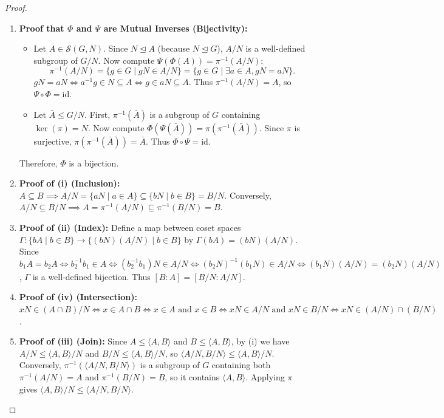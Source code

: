 \begin{proof}
\begin{enumerate}[label=\arabic*., leftmargin=*]
    \item \textbf{Proof that $\Phi$ and $\Psi$ are Mutual Inverses (Bijectivity):}
    \begin{itemize}[leftmargin=1.5em, itemsep=4pt]
        \item Let $A \in \mathcal{S}(G, N)$.
        Since $N \trianglelefteq A$ (because $N \trianglelefteq G$), $A/N$ is a well-defined subgroup of $G/N$.
        Now compute $\Psi(\Phi(A)) = \pi^{-1}(A/N)$:
        \begin{equation*}
        \pi^{-1}(A/N) = \{ g \in G \mid gN \in A/N \} = \{ g \in G \mid \exists a \in A, gN = aN \}.
        \end{equation*}
        $gN = aN \iff a^{-1}g \in N \subseteq A \iff g \in aN \subseteq A$.
        Thus $\pi^{-1}(A/N) = A$, so $\Psi \circ \Phi = \text{id}$.
        
        \item Let $\bar{A} \le G/N$.
        First, $\pi^{-1}(\bar{A})$ is a subgroup of $G$ containing $\ker(\pi) = N$.
        Now compute $\Phi(\Psi(\bar{A})) = \pi(\pi^{-1}(\bar{A}))$.
        Since $\pi$ is surjective, $\pi(\pi^{-1}(\bar{A})) = \bar{A}$.
        Thus $\Phi \circ \Psi = \text{id}$.
    \end{itemize}
    Therefore, $\Phi$ is a bijection.

    \item \textbf{Proof of (i) (Inclusion):}
    $A \subseteq B \implies A/N = \{aN \mid a \in A\} \subseteq \{bN \mid b \in B\} = B/N$.
    Conversely, $A/N \subseteq B/N \implies A = \pi^{-1}(A/N) \subseteq \pi^{-1}(B/N) = B$.

    \item \textbf{Proof of (ii) (Index):}
    Define a map between coset spaces $\Gamma: \{ bA \mid b \in B \} \to \{ (bN)(A/N) \mid b \in B \}$ by $\Gamma(bA) = (bN)(A/N)$.
    Since $b_1 A = b_2 A \iff b_2^{-1}b_1 \in A \iff (b_2^{-1}b_1)N \in A/N \iff (b_2 N)^{-1}(b_1 N) \in A/N \iff (b_1 N)(A/N) = (b_2 N)(A/N)$, $\Gamma$ is a well-defined bijection.
    Thus $[B : A] = [B/N : A/N]$.

    \item \textbf{Proof of (iv) (Intersection):}
    $xN \in (A \cap B)/N \iff x \in A \cap B \iff x \in A \text{ and } x \in B \iff xN \in A/N \text{ and } xN \in B/N \iff xN \in (A/N) \cap (B/N)$.

    \item \textbf{Proof of (iii) (Join):}
    Since $A \le \langle A, B \rangle$ and $B \le \langle A, B \rangle$, by (i) we have $A/N \le \langle A, B \rangle/N$ and $B/N \le \langle A, B \rangle/N$, so $\langle A/N, B/N \rangle \le \langle A, B \rangle/N$.
    Conversely, $\pi^{-1}(\langle A/N, B/N \rangle)$ is a subgroup of $G$ containing both $\pi^{-1}(A/N) = A$ and $\pi^{-1}(B/N) = B$, so it contains $\langle A, B \rangle$. Applying $\pi$ gives $\langle A, B \rangle/N \le \langle A/N, B/N \rangle$.


\end{enumerate}
\end{proof}
